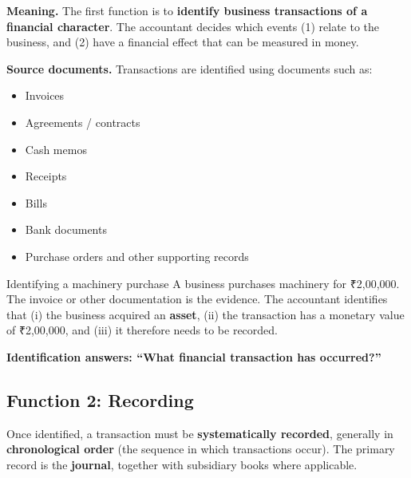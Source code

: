 \documentclass[11pt,a4paper]{article}
\newcommand{\Rs}{{\rsfont ₹}}
\begin{document}
\textbf{Meaning.} The first function is to \textbf{identify business transactions of a financial
character}. The accountant decides which events (1) relate to the business, and (2) have a
financial effect that can be measured in money.

\textbf{Source documents.} Transactions are identified using documents such as:

\begin{itemize}
  \item Invoices
  \item Agreements / contracts
  \item Cash memos
  \item Receipts
  \item Bills
  \item Bank documents
  \item Purchase orders and other supporting records
\end{itemize}

\begin{exbox}{Identifying a machinery purchase}
A business purchases machinery for \Rs 2,00,000. The invoice or other documentation is the
evidence. The accountant identifies that (i) the business acquired an \textbf{asset},
(ii) the transaction has a monetary value of \Rs 2,00,000, and (iii) it therefore needs to
be recorded.
\end{exbox}

\begin{keybox}
\textbf{Identification answers: ``What financial transaction has occurred?''}
\end{keybox}

\subsection{Function 2: Recording}

Once identified, a transaction must be \textbf{systematically recorded}, generally in
\textbf{chronological order} (the sequence in which transactions occur). The primary record is the
\textbf{journal}, together with subsidiary books where applicable.
\end{document}
